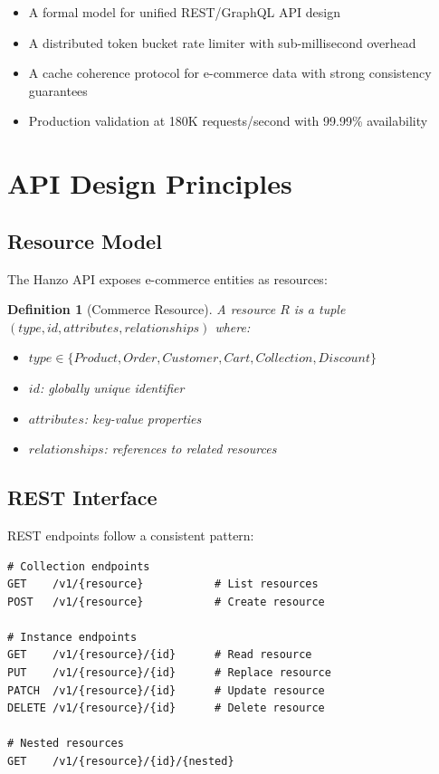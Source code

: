 \documentclass[11pt,a4paper]{article}
\newtheorem{definition}[theorem]{Definition}
\begin{document}
\begin{itemize}
    \item A formal model for unified REST/GraphQL API design
    \item A distributed token bucket rate limiter with sub-millisecond overhead
    \item A cache coherence protocol for e-commerce data with strong consistency guarantees
    \item Production validation at 180K requests/second with 99.99\% availability
\end{itemize}

\section{API Design Principles}

\subsection{Resource Model}

The Hanzo API exposes e-commerce entities as resources:

\begin{definition}[Commerce Resource]
A resource $R$ is a tuple $(type, id, attributes, relationships)$ where:
\begin{itemize}
    \item $type \in \{Product, Order, Customer, Cart, Collection, Discount\}$
    \item $id$: globally unique identifier
    \item $attributes$: key-value properties
    \item $relationships$: references to related resources
\end{itemize}
\end{definition}

\subsection{REST Interface}

REST endpoints follow a consistent pattern:

\begin{lstlisting}[caption=REST Endpoint Structure]
# Collection endpoints
GET    /v1/{resource}           # List resources
POST   /v1/{resource}           # Create resource

# Instance endpoints
GET    /v1/{resource}/{id}      # Read resource
PUT    /v1/{resource}/{id}      # Replace resource
PATCH  /v1/{resource}/{id}      # Update resource
DELETE /v1/{resource}/{id}      # Delete resource

# Nested resources
GET    /v1/{resource}/{id}/{nested}
\end{lstlisting}
\end{document}
